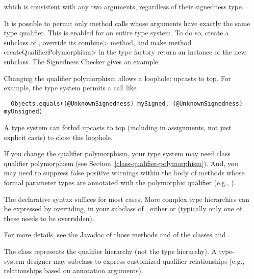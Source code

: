 \noindent
which is consistent with any two arguments, regardless of their signedness
type.

It is possible to permit only method calls whose arguments have exactly the
same type qualifier.  This is enabled for an entire type system.  To do so,
create a subclass of
, override its
\<combine> method, and make method \<createQualifierPolymorphism> in the
type factory return an instance of the new subclass.  The Signedness
Checker gives an example.

Changing the qualifier polymorphism allows a loophole:  upcasts to top.
For example, the type system permits a call like

\begin{Verbatim}
  Objects.equals((@UnknownSignedness) mySigned, (@UnknownSignedness) myUnsigned)
\end{Verbatim}

\noindent
A type system can forbid upcasts to top (including in assignments, not just
explicit casts) to close this loophole.

If you change the qualifier polymorphism, your type system may need class
qualifier polymorphism (see Section~\ref{class-qualifier-polymorphism}).
And, you may need to suppress
false positive warnings within the body of methods whose formal parameter
types are annotated with the polymorphic qualifier (e.g.,
).



The declarative syntax suffices for most cases.  More complex type
hierarchies can be expressed by overriding, in your subclass of
, either
or 
(typically only one of these needs to be overridden).

For more details, see the Javadoc of those methods and of the classes
 and .

The  class represents the qualifier hierarchy (not the
type hierarchy).  A type-system designer may subclass
 to express customized qualifier
relationships (e.g., relationships based on annotation
arguments).

